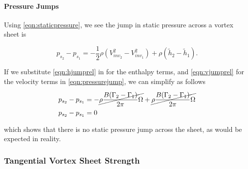 






\paragraph{Pressure Jumps}

Using \cref{eqn:staticpressure}, we see the jump in static pressure across a vortex sheet is

\begin{equation}
    \label{eqn:pressurejump}
    p_{s_2} - p_{s_1} = -\frac{1}{2} \rho \left(V_{{inv}_2}^2 - V_{{inv}_1}^2 \right) + \rho \left( \widetilde{h}_2 - \widetilde{h}_1 \right).
\end{equation}


\noindent If we substitute \cref{eqn:hjumprel} in for the enthalpy terms, and \cref{eqn:vjumprel} for the velocity terms in \cref{eqn:pressurejump}, we can simplify as follows

\begin{align}
    p_{s_2} - p_{s_1} &= -\cancel{\rho \frac{B(\Gamma_2-\Gamma_1)}{2 \pi} \Omega} + \cancel{\rho \frac{B(\Gamma_2-\Gamma_1)}{2 \pi} \Omega} \\
    p_{s_2} - p_{s_1} &= 0
\end{align}

\noindent which shows that there is no static pressure jump across the sheet, as would be expected in reality.





\subsubsection{Tangential Vortex Sheet Strength}
\label{ssec:vortexsheetstrength}

